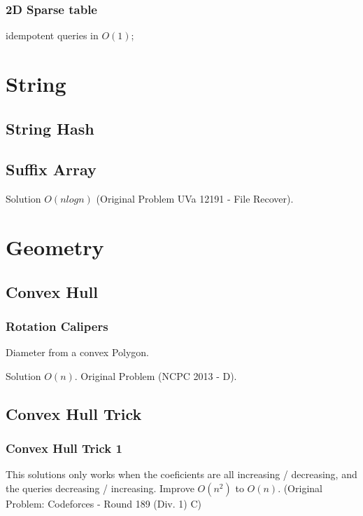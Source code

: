 \documentclass{report}
\newcommand{\RomanNumeralCaps}[1]
    {\MakeUppercase{\romannumeral #1}}
\begin{document}
    \subsection{2D Sparse table}
    idempotent queries in $O(1)$;
    
    \chapter{String \RomanNumeralCaps{4}}
    \section{String Hash}
    
    
    \section{Suffix Array}
    Solution $O(nlogn)$ (Original 
    Problem UVa 12191 - File Recover).
    
    \bigskip
    
    
    
    \chapter{Geometry \RomanNumeralCaps{8}}
    \section{Convex Hull}
        \subsection{Rotation Calipers}
        Diameter from a convex Polygon.
        
        Solution $O(n)$. Original Problem (NCPC 2013 - D).
        
        
        
        
    \section{Convex Hull Trick}
        \subsection{Convex Hull Trick 1}
        This solutions only works when the coeficients are all increasing / decreasing, and the queries decreasing / increasing. Improve $O(n^2)$ to $O(n)$. (Original Problem: Codeforces - Round 189 (Div. 1) C)
        
        \newpage
\end{document}
